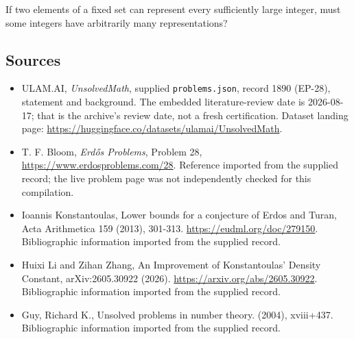 \documentclass[11pt,a4paper]{article}
\begin{document}
If two elements of a fixed set can represent every sufficiently large integer, must some integers have arbitrarily many representations?

\subsection{Sources}

{\small

\begin{itemize}

\item[\hypertarget{source:1890:1}{S1}] ULAM.AI, \emph{UnsolvedMath}, supplied \texttt{problems.json}, record 1890 (EP-28), statement and background. The embedded literature-review date is 2026-08-17; that is the archive’s review date, not a fresh certification. Dataset landing page: \url{https://huggingface.co/datasets/ulamai/UnsolvedMath}.

\item[\hypertarget{source:1890:2}{S2}] T. F. Bloom, \emph{Erdős Problems}, Problem 28, \url{https://www.erdosproblems.com/28}. Reference imported from the supplied record; the live problem page was not independently checked for this compilation.

\item[\hypertarget{source:1890:3}{S3}] Ioannis Konstantoulas, Lower bounds for a conjecture of Erdos and Turan, Acta Arithmetica 159 (2013), 301-313. \url{https://eudml.org/doc/279150}. Bibliographic information imported from the supplied record.

\item[\hypertarget{source:1890:4}{S4}] Huixi Li and Zihan Zhang, An Improvement of Konstantoulas' Density Constant, arXiv:2605.30922 (2026). \url{https://arxiv.org/abs/2605.30922}. Bibliographic information imported from the supplied record.

\item[\hypertarget{source:1890:5}{S5}] Guy, Richard K., Unsolved problems in number theory. (2004), xviii+437. Bibliographic information imported from the supplied record.

\end{itemize}

}

\label{end:1890}
\end{document}

